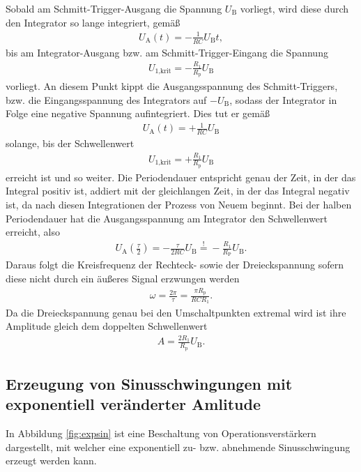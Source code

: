 Sobald am Schmitt-Trigger-Ausgang die Spannung $U_\text{B}$ vorliegt, wird diese
durch den Integrator so lange integriert, gemäß
\begin{align}
  U_\text{A}(t) = -\frac1{RC} U_\text{B} t,
\end{align}
bis am Integrator-Ausgang bzw. am Schmitt-Trigger-Eingang die Spannung
\begin{align}
  U_\text{1,krit} = - \frac{R_1}{R_\text{p}} U_\text{B}
\end{align}
vorliegt. An diesem Punkt kippt die Ausgangsspannung des Schmitt-Triggers, bzw. die Eingangsspannung
des Integrators auf $-U_\text{B}$, sodass der Integrator in Folge eine negative Spannung
aufintegriert. Dies tut er gemäß
\begin{align}
  U_\text{A}(t) = + \frac1{RC} U_\text{B}
\end{align}
solange, bis der Schwellenwert
\begin{align}
  U_\text{1,krit} = + \frac{R_1}{R_\text{p}} U_\text{B}
\end{align}
erreicht ist und so weiter. Die Periodendauer entspricht genau der Zeit, in der das Integral positiv ist, addiert mit
der gleichlangen Zeit, in der das Integral negativ ist, da nach diesen Integrationen der Prozess von
Neuem beginnt. Bei der halben Periodendauer hat die Ausgangsspannung am Integrator den
Schwellenwert erreicht, also
\begin{align}
  U_\text{A}\left( \frac{\tau}{2} \right) = -\frac{\tau}{2RC} U_\text{B} \stackrel{!}{=} -\frac{R_1}{R_\text{P}} U_\text{B}.
\end{align}
Daraus folgt die Kreisfrequenz der Rechteck- sowie der Dreieckspannung sofern diese nicht durch ein
äußeres Signal erzwungen werden
\begin{align}
  \omega = \frac{2\pi}{\tau} = \frac{\pi R_\text{p}}{R C R_1}.
  \label{eqn:freq_signalgen}
\end{align}
Da die Dreieckspannung genau bei den Umschaltpunkten extremal wird ist ihre Amplitude gleich dem
doppelten Schwellenwert
\begin{align}
  A = \frac{2 R_1}{R_\text{p}} U_\text{B}.
  \label{eqn:ampl_drei}
\end{align}

\subsection{Erzeugung von Sinusschwingungen mit exponentiell veränderter Amlitude}

In Abbildung \ref{fig:expsin} ist eine Beschaltung von Operationsverstärkern dargestellt, mit welcher
eine exponentiell zu- bzw. abnehmende Sinusschwingung erzeugt werden kann.


